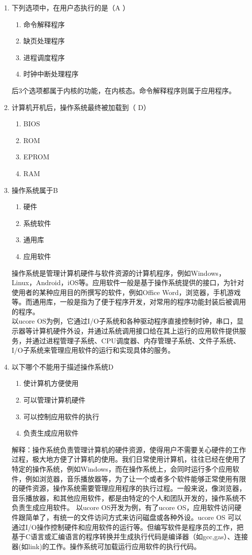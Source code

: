 \begin{enumerate}
\item 下列选项中，在用户态执行的是（A ）
\begin{enumerate}[A]
	\item 命令解释程序
	\item 缺页处理程序
	\item 进程调度程序
	\item 时钟中断处理程序
\end{enumerate}
后3个选项都属于内核的功能，在内核态。命令解释程序则属于应用程序。
\item 计算机开机后，操作系统最终被加载到（ D）
\begin{enumerate}[A]
	\item BIOS
	\item ROM
	\item EPROM
	\item RAM
\end{enumerate}
\item 操作系统属于B
\begin{enumerate}[A]
	\item 硬件
	\item 系统软件
	\item 通用库
	\item 应用软件
\end{enumerate}
操作系统是管理计算机硬件与软件资源的计算机程序，例如Windows，Linux，Android，iOS等。应用软件一般是基于操作系统提供的接口，为针对使用者的某种应用目的所撰写的软件，例如Office Word，浏览器，手机游戏等。而通用库，一般是指为了便于程序开发，对常用的程序功能封装后被调用的程序。\\
以ucore OS为例，它通过I/O子系统和各种驱动程序直接控制时钟，串口，显示器等计算机硬件外设，并通过系统调用接口给在其上运行的应用软件提供服务，并通过进程管理子系统、CPU调度器、内存管理子系统、文件子系统、I/O子系统来管理应用软件的运行和实现具体的服务。
\item 以下哪个不能用于描述操作系统D
\begin{enumerate}[A]
	\item 
	使计算机方便使用
	\item 可以管理计算机硬件
	\item 可以控制应用软件的执行
	\item 负责生成应用软件 
\end{enumerate}
解释：操作系统负责管理计算机的硬件资源，使得用户不需要关心硬件的工作过程，极大地方便了计算机的使用。我们日常使用计算机，往往已经在使用了特定的操作系统，例如Windows，而在操作系统上，会同时运行多个应用软件，例如浏览器，音乐播放器等，为了让一个或者多个软件能够正常使用有限的硬件资源，操作系统需要管理应用程序的执行过程。一般来说，像浏览器，音乐播放器，和其他应用软件，都是由特定的个人和团队开发的，操作系统不负责生成应用软件。 以ucore OS开发为例，有了ucore OS，应用软件访问硬件跟简单了，有统一的文件访问方式来访问磁盘或各种外设。ucore OS 可以通过I/O操作控制硬件和应用软件的运行等。但编写软件是程序员的工作，把基于C语言或汇编语言的程序转换并生成执行代码是编译器（如gcc,gas）、连接器(如link)的工作。操作系统可加载运行应用软件的执行代码。

\end{enumerate}
